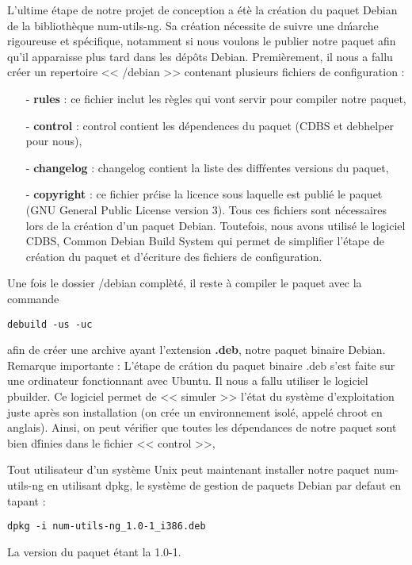 L'ultime \'etape de notre projet de conception a \'et\`e la cr\'eation du paquet Debian de la biblioth\`eque num-utils-ng.
Sa cr\'eation n\'ecessite de suivre une d\'marche rigoureuse et sp\'ecifique, notamment si nous voulons le publier notre paquet afin
qu'il apparaisse plus tard dans les d\'ep\^ots Debian.
\newline
Premi\`erement, il nous a fallu cr\'eer un repertoire << /debian >> contenant plusieurs fichiers de configuration :
\begin{itemize}
 \item [-] \textbf{rules} : ce fichier inclut les r\`egles qui vont servir pour compiler notre paquet,
 \item [-] \textbf{control} : control contient les d\'ependences du paquet (CDBS et debhelper pour nous),
 \item [-] \textbf{changelog} : changelog contient la liste des diff\'rentes versions du paquet, 
 \item [-] \textbf{copyright} : ce fichier pr\'cise la licence sous laquelle est publi\'e le paquet (GNU General Public License version 3).
Tous ces fichiers sont n\'ecessaires lors  de la cr\'eation d'un paquet Debian. Toutefois, nous avons utilis\'e le logiciel 
CDBS, Common Debian Build System\citep{cdbs} qui permet de simplifier l'\'etape de cr\'eation du paquet et d'\'ecriture des fichiers de configuration.
\newline
\end{itemize}
Une fois le dossier /debian compl\`et\'e, il reste \`a compiler le paquet avec la commande
\begin{verbatim}debuild -us -uc\end{verbatim}
afin de cr\'eer une archive ayant l'extension \textbf{.deb}, notre paquet binaire Debian.
\newline
Remarque importante : L'\'etape de cr\'ation du paquet binaire .deb s'est faite sur une ordinateur fonctionnant avec Ubuntu. Il nous a fallu utiliser le logiciel pbuilder. Ce logiciel
permet de << simuler >> l'\'etat du syst\`eme d'exploitation juste apr\`es son installation (on cr\'ee un environnement isol\'e, appel\'e chroot en anglais).
Ainsi, on peut v\'erifier que toutes les d\'ependances de notre paquet sont bien d\'finies dans le fichier << control >>, 
\newline

Tout utilisateur d'un syst\`eme Unix peut maintenant installer notre paquet num-utils-ng en utilisant dpkg, le syst\`eme de gestion de paquets Debian 
par defaut en tapant :
\begin{verbatim}dpkg -i num-utils-ng_1.0-1_i386.deb\end{verbatim}
La version du paquet \'etant la 1.0-1.





